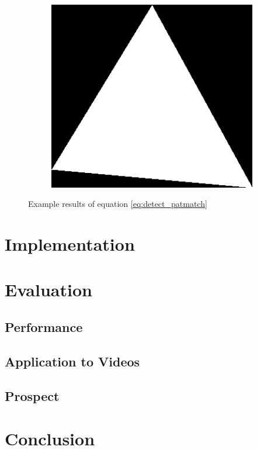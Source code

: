 \documentclass{report}
\begin{document}
\begin{figure}
\begin{subfigure}[t]{0.3\textwidth}
  \end{subfigure}
  \qquad
  \begin{subfigure}[t]{0.3\textwidth}
    \includegraphics[width=1\textwidth]{src/patmatch_tri2}
  \end{subfigure}
  \caption{Example results of equation \ref{eq:detect_patmatch}}
\end{figure}


\pagebreak
\chapter{Implementation}
\label{chap:implementation}

\pagebreak
\chapter{Evaluation}
\label{chap:evaluation}
{\color{red}{To be written}}

\section{Performance}
{\color{red}{To be written}}

\section{Application to Videos}
{\color{red}{To be written (ROI, Frame-Skipping)}}

\section{Prospect}
{\color{red}{To be written (Other approaches: k-means clustering for
    segmentation, Otsu? ...)}}


\pagebreak
\chapter{Conclusion}
\label{chap:conclusion}
\end{document}
